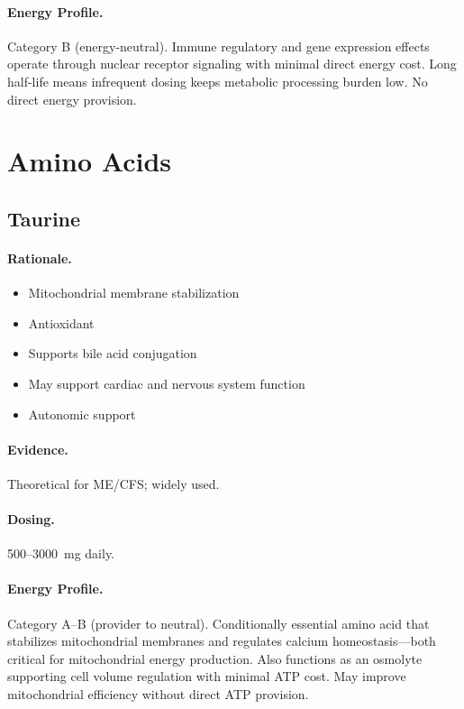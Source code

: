 \paragraph{Energy Profile.}
Category B (energy-neutral). Immune regulatory and gene expression effects operate through nuclear receptor signaling with minimal direct energy cost. Long half-life means infrequent dosing keeps metabolic processing burden low. No direct energy provision.

\section{Amino Acids}
\label{sec:amino-acids}

\subsection{Taurine}

\paragraph{Rationale.}
\begin{itemize}
    \item Mitochondrial membrane stabilization
    \item Antioxidant
    \item Supports bile acid conjugation
    \item May support cardiac and nervous system function
    \item Autonomic support
\end{itemize}

\paragraph{Evidence.} Theoretical for ME/CFS; widely used.

\paragraph{Dosing.} 500--3000~mg daily.

\paragraph{Energy Profile.}
Category A--B (provider to neutral). Conditionally essential amino acid that stabilizes mitochondrial membranes and regulates calcium homeostasis---both critical for mitochondrial energy production. Also functions as an osmolyte supporting cell volume regulation with minimal ATP cost. May improve mitochondrial efficiency without direct ATP provision.

